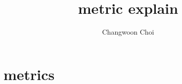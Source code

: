 \documentclass{article}
\title{metric explain}
\author{Changwoon Choi}
\begin{document}
\maketitle
\section{metrics}




\end{document}

